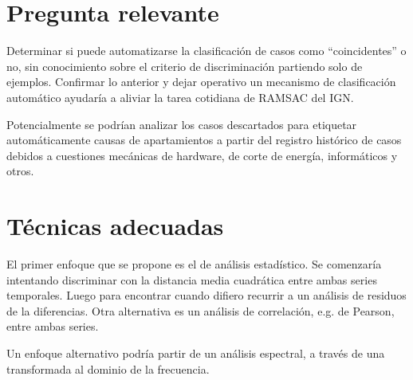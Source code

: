 \documentclass[11pt,spanish,a4paper]{article}
\begin{document}



\section*{Pregunta relevante}
Determinar si puede automatizarse la clasificación de casos como ``coincidentes'' o no, sin conocimiento sobre el criterio de discriminación partiendo solo de ejemplos.
Confirmar lo anterior y dejar operativo un mecanismo de clasificación automático ayudaría a aliviar la tarea cotidiana de RAMSAC del IGN.

Potencialmente se podrían analizar los casos descartados para etiquetar automáticamente causas de apartamientos a partir del registro histórico de casos debidos a cuestiones mecánicas de hardware, de corte de energía, informáticos y otros.

\section*{Técnicas adecuadas}
El primer enfoque que se propone es el de análisis estadístico.
Se comenzaría intentando discriminar con la distancia media cuadrática entre ambas series temporales.
Luego para encontrar cuando difiero recurrir a un análisis de residuos de la diferencias.
Otra alternativa es un análisis de correlación, e.g. de Pearson, entre ambas series.

Un enfoque alternativo podría partir de un análisis espectral, a través de una transformada al dominio de la frecuencia.



\printbibliography[title= Referencias, heading=bibintoc]
\end{document}
